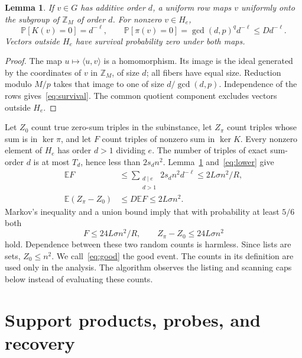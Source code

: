\documentclass[acmsmall,11pt,nonacm,natbib=false]{acmart}
\newtheorem{lemma}[theorem]{Lemma}
\newcommand{\Z}{\mathbb Z}
\newcommand{\E}{\mathbb E}
\newcommand{\Prob}{\mathbb P}
\begin{document}
\begin{lemma}\label{lem:survival}
If $v\in G$ has additive order $d$, a uniform row maps $v$ uniformly onto
the subgroup of $\Z_M$ of order $d$. For nonzero $v\in H_e$,
\begin{equation}\label{eq:survival}
 \Prob[K(v)=0]=d^{-\ell},\qquad
 \Prob[\pi(v)=0]=\gcd(d,p)^q d^{-\ell}\le Dd^{-\ell}.
\end{equation}
Vectors outside $H_e$ have survival probability zero under both maps.
\end{lemma}
\begin{proof}
The map $u\mapsto\langle u,v\rangle$ is a homomorphism. Its image is the
ideal generated by the coordinates of $v$ in $\Z_M$, of size $d$; all
fibers have equal size. Reduction modulo $M/p$ takes that image to one of
size $d/\gcd(d,p)$. Independence of the rows gives~\eqref{eq:survival}.
The common quotient component excludes vectors outside $H_e$.
\end{proof}

Let $Z_0$ count true zero-sum triples in the subinstance, let $Z_\pi$ count
triples whose sum is in $\ker\pi$, and let $F$ count triples of nonzero
sum in $\ker K$. Every nonzero element of $H_e$ has order $d>1$ dividing
$e$. The number of triples of exact sum-order $d$ is at most $T_d$, hence
less than $2s_dn^2$. Lemma~\ref{lem:survival} and~\eqref{eq:lower} give
\begin{align}
 \E F&\le\sum_{\substack{d\mid e\\d>1}}2s_dn^2d^{-\ell}
       \le 2L\sigma n^2/R,\label{eq:EF}\\
 \E(Z_\pi-Z_0)&\le D\E F\le2L\sigma n^2.\label{eq:EZ}
\end{align}
Markov's inequality and a union bound imply that with probability at least
$5/6$ both
\begin{equation}\label{eq:good}
 F\le24L\sigma n^2/R,\qquad Z_\pi-Z_0\le24L\sigma n^2
\end{equation}
hold. Dependence between these two random counts is harmless. Since lists
are sets, $Z_0\le n^2$. We call~\eqref{eq:good} the good event. The counts
in its definition are used only in the analysis. The algorithm observes
the listing and scanning caps below instead of evaluating these counts.

\section{Support products, probes, and recovery}\label{sec:support}
\end{document}
